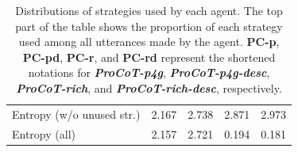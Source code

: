 \begin{table}[t]
\begin{tabular}{lcccc}
        \midrule
        Entropy (w/o unused str.) & 2.167 & 2.738 & 2.871 & 2.973 \\
        Entropy (all) & 2.157 & 2.721 & 0.194 & 0.181 \\
        \bottomrule
    \end{tabular}
    \caption{Distributions of strategies used by each agent. The top part of the table shows the proportion of each strategy used among all utterances made by the agent.
    \textbf{PC-p}, \textbf{PC-pd}, \textbf{PC-r}, and \textbf{PC-rd} represent the shortened notations for \textbf{\textit{ProCoT-p4g}}, \textbf{\textit{ProCoT-p4g-desc}}, \textbf{\textit{ProCoT-rich}}, and \textbf{\textit{ProCoT-rich-desc}}, respectively.}
    \label{tab:agent_strategy_analisis}
\end{table}